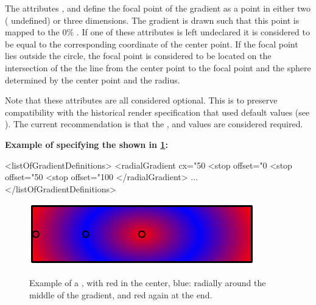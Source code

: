 The attributes ,  and  define the focal point of the gradient as a point in either two ( undefined) or three dimensions. The gradient is drawn such that this point is mapped to the 0\% \GradientStop. If one of these attributes is left undeclared it is considered to be equal to the corresponding coordinate of the center point. If the focal point lies outside 
the circle, the focal point is considered to be located on the intersection of the the line from the center
point to the focal point and the sphere determined by the center point and the radius.

Note that these attributes are all considered optional. This is to preserve compatibility with the historical render specification that used default values (see ). The current recommendation is that the ,  and  values are considered required.

  {\bf
Example of specifying the \RadialGradient shown in \ref{fig:radgrad}:
}

{\footnotesize
\begin{example}
<listOfGradientDefinitions>
  <radialGradient cx="50%
    <stop offset="0%
    <stop offset="50%
    <stop offset="100%
  </radialGradient>
       ...
</listOfGradientDefinitions>
\end{example}
}

\begin{figure}[!ht]
  \centering
  \includegraphics{figures/radgrad01.pdf}\\
  \caption{Example of a \RadialGradient, with red in the center, blue: radially around the middle of the gradient, and red again at the end.}
  \label{fig:radgrad}
\end{figure}






